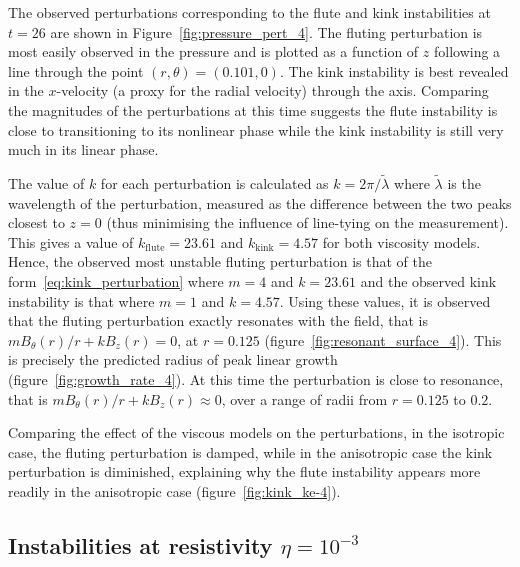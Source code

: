 \documentclass[fleqn,usenatbib]{mnras}
\newcommand{\rs}[2]{{#2}}
\begin{document}
\rs{Figure~\ref{fig:pressure_pert_4} plots the }{The} observed
  perturbations corresponding to the \rs{fluting}{flute} and kink
  instabilities at $t=26$ \rs{}{are shown in
  Figure~\ref{fig:pressure_pert_4}}. The fluting perturbation is
  most easily observed in the pressure and is plotted as a function of $z$
  following a line through the point $(r, \theta) = (0.101, 0)$. The
  kink instability is best revealed in the $x$-velocity (a proxy for the
  radial velocity) through the axis. Comparing the magnitudes of the
  perturbations at this time suggests the \rs{fluting}{flute}
  instability is close to transitioning to its nonlinear phase while
  the kink instability is still very much in its linear
  phase.

The value of $k$ for each perturbation is calculated as $k = 2\pi/\tilde{\lambda}$ where $\tilde{\lambda}$ is the wavelength of the perturbation, measured as the difference between the two peaks closest to $z=0$ (thus minimising the influence of line-tying on the measurement). This gives a value of $k_{\rs{flute}{\text{flute}}}=23.61$ and $k_{\rs{kink}{\text{kink}}}=4.57$ for both viscosity models. Hence, the observed most unstable fluting perturbation is that of the form~\eqref{eq:kink_perturbation} where $m=4$ and $k=23.61$ and the observed kink instability is that where $m=1$ and $k=4.57$. Using these values, it is observed that the fluting perturbation exactly resonates with the field, that is $m B_{\theta}(r)/r + kB_z(r) = 0$, at $r=0.125$ (figure~\ref{fig:resonant_surface_4}). This is precisely the predicted radius of peak linear growth (figure~\ref{fig:growth_rate_4}). At this time the perturbation is close to resonance, that is $m B_{\theta}(r)/r + kB_z(r) \approx 0$, over a range of radii from $r=0.125$ to $0.2$.

Comparing the effect of the viscous models on the perturbations, in the isotropic case, the fluting perturbation is damped, while in the \rs{switching}{anisotropic} case the kink perturbation is diminished, explaining why the \rs{fluting}{flute} instability appears more readily in the \rs{switching}{anisotropic} case (figure~\ref{fig:kink_ke-4}).

\subsection{\rs{Development where}{Instabilities at resistivity} $\eta=10^{-3}$}
\end{document}
